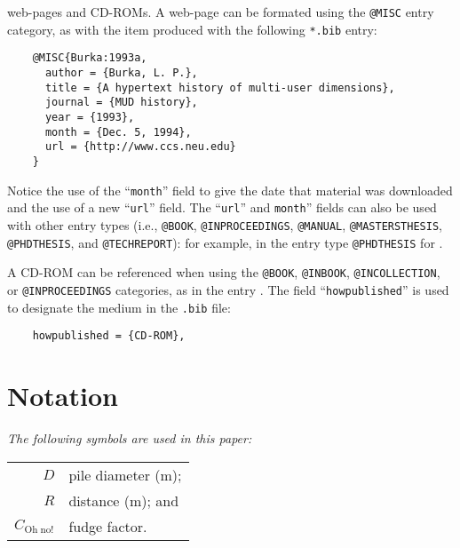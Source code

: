 \documentclass[Journal,letterpaper]{ascelike-new}
\begin{document}
web-pages and CD-ROMs.  A web-page can be formated using the
\texttt{@MISC} entry category, as with the item \cite{Burka:1993a} produced
with the following \texttt{*.bib} entry:
\begin{verbatim}
    @MISC{Burka:1993a,
      author = {Burka, L. P.},
      title = {A hypertext history of multi-user dimensions},
      journal = {MUD history},
      year = {1993},
      month = {Dec. 5, 1994},
      url = {http://www.ccs.neu.edu}
    }
\end{verbatim}
Notice the use of the ``\texttt{month}'' field to give the date that material
was downloaded and the use of a new ``\texttt{url}'' field.
The ``\texttt{url}'' and \texttt{month}'' 
fields can also be used with other entry types
(i.e., \texttt{@BOOK}, \texttt{@INPROCEEDINGS}, \texttt{@MANUAL},
\texttt{@MASTERSTHESIS}, \texttt{@PHDTHESIS}, and \texttt{@TECHREPORT}):
for example, in the entry type \texttt{@PHDTHESIS} for \cite{Wichtmann:2005a}.
%
\par
A CD-ROM can be referenced when using the \texttt{@BOOK}, \texttt{@INBOOK},
\texttt{@INCOLLECTION}, or \texttt{@INPROCEEDINGS} categories, 
as in the entry \cite{Liggett:1998a}.
The field ``\texttt{howpublished}'' is used to designate the medium
in the \texttt{.bib} file:
\begin{verbatim}
    howpublished = {CD-ROM},
\end{verbatim}
%
\pagebreak
%
\appendix
%
%
\section{Notation}
\label{app:notation}
\emph{The following symbols are used in this paper:}%
\nopagebreak
\par
\begin{tabular}{r  @{\hspace{1em}=\hspace{1em}}  l}
$D$                    & pile diameter (m); \\
$R$                    & distance (m);      and\\
$C_{\mathrm{Oh\;no!}}$ & fudge factor.
\end{tabular}
\end{document}
